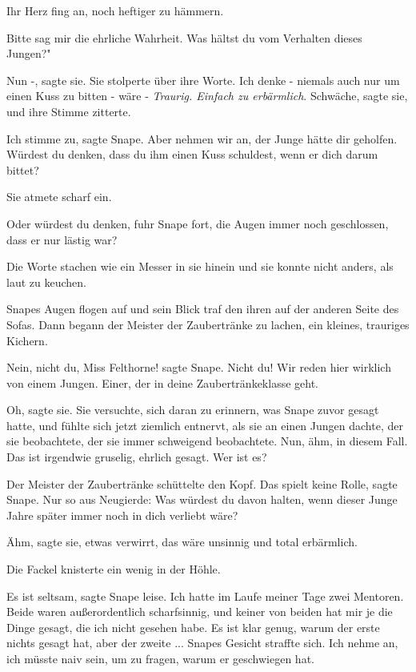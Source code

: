 Ihr Herz fing an, noch heftiger zu hämmern.

\glqq Bitte sag mir die ehrliche Wahrheit. Was hältst du vom Verhalten dieses
Jungen?"

\glqq Nun -\grqq{}, sagte sie. Sie stolperte über ihre Worte. \glqq Ich denke -
niemals auch nur um einen Kuss zu bitten - wäre -\grqq{} \emph{Traurig. Einfach
zu erbärmlich}. \glqq Schwäche\grqq{}, sagte sie, und ihre Stimme zitterte.

\glqq Ich stimme zu\grqq{}, sagte Snape. \glqq Aber nehmen wir an, der Junge
hätte dir geholfen. Würdest du denken, dass du ihm einen Kuss schuldest, wenn er
dich darum bittet?\grqq{}

Sie atmete scharf ein.

\glqq Oder würdest du denken\grqq{}, fuhr Snape fort, die Augen immer noch
geschlossen, \glqq dass er nur lästig war?\grqq{}

Die Worte stachen wie ein Messer in sie hinein und sie konnte nicht anders, als
laut zu keuchen.

Snapes Augen flogen auf und sein Blick traf den ihren auf der anderen Seite des
Sofas. Dann begann der Meister der Zaubertränke zu lachen, ein kleines,
trauriges Kichern.

\glqq Nein, nicht du, Miss Felthorne!\grqq{} sagte Snape. \glqq Nicht du! Wir
reden hier wirklich von einem Jungen. Einer, der in deine Zaubertränkeklasse
geht.\grqq{}

\glqq Oh\grqq{}, sagte sie. Sie versuchte, sich daran zu erinnern, was Snape
zuvor gesagt hatte, und fühlte sich jetzt ziemlich entnervt, als sie an einen
Jungen dachte, der sie beobachtete, der sie immer schweigend beobachtete. \glqq
Nun, ähm, in diesem Fall. Das ist irgendwie gruselig, ehrlich gesagt. Wer ist
es?\grqq{}

Der Meister der Zaubertränke schüttelte den Kopf. \glqq Das spielt keine
Rolle\grqq{}, sagte Snape. \glqq Nur so aus Neugierde: Was würdest du davon
halten, wenn dieser Junge Jahre später immer noch in dich verliebt wäre?\grqq{}

\glqq Ähm\grqq{}, sagte sie, etwas verwirrt, \glqq das wäre unsinnig und total
erbärmlich.\grqq{}

Die Fackel knisterte ein wenig in der Höhle.

\glqq Es ist seltsam\grqq{}, sagte Snape leise. \glqq Ich hatte im Laufe meiner
Tage zwei Mentoren. Beide waren außerordentlich scharfsinnig, und keiner von
beiden hat mir je die Dinge gesagt, die ich nicht gesehen habe. Es ist klar
genug, warum der erste nichts gesagt hat, aber der zweite ...\grqq{} Snapes
Gesicht straffte sich. \glqq Ich nehme an, ich müsste naiv sein, um zu fragen,
warum er geschwiegen hat.\grqq{}

